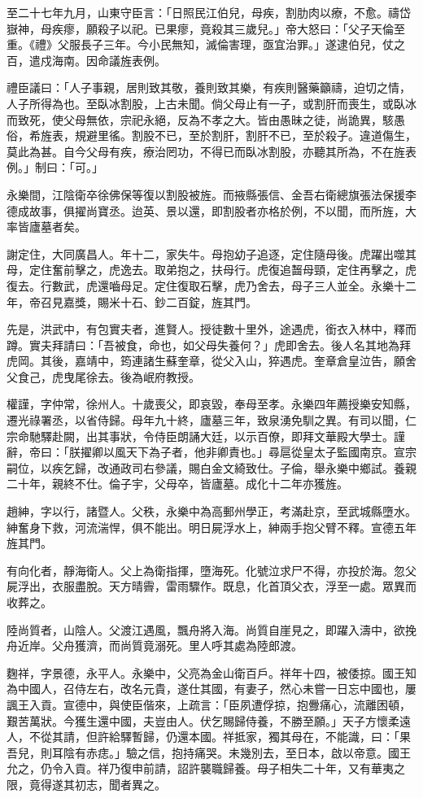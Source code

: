 \begin{pinyinscope}
至二十七年九月，山東守臣言：「日照民江伯兒，母疾，割肋肉以療，不愈。禱岱嶽神，母疾瘳，願殺子以祀。已果瘳，竟殺其三歲兒。」帝大怒曰：「父子天倫至重。《禮》父服長子三年。今小民無知，滅倫害理，亟宜治罪。」遂逮伯兒，仗之百，遣戍海南。因命議旌表例。

禮臣議曰：「人子事親，居則致其敬，養則致其樂，有疾則醫藥籲禱，迫切之情，人子所得為也。至臥冰割股，上古未聞。倘父母止有一子，或割肝而喪生，或臥冰而致死，使父母無依，宗祀永絕，反為不孝之大。皆由愚昧之徒，尚詭異，駭愚俗，希旌表，規避里徭。割股不已，至於割肝，割肝不已，至於殺子。違道傷生，莫此為甚。自今父母有疾，療治罔功，不得已而臥冰割股，亦聽其所為，不在旌表例。」制曰：「可。」

永樂間，江陰衛卒徐佛保等復以割股被旌。而掖縣張信、金吾右衛總旗張法保援李德成故事，俱擢尚寶丞。迨英、景以還，即割股者亦格於例，不以聞，而所旌，大率皆廬墓者矣。

謝定住，大同廣昌人。年十二，家失牛。母抱幼子追逐，定住隨母後。虎躍出噬其母，定住奮前擊之，虎逸去。取弟抱之，扶母行。虎復追齧母頸，定住再擊之，虎復去。行數武，虎還嚙母足。定住復取石擊，虎乃舍去，母子三人並全。永樂十二年，帝召見嘉獎，賜米十石、鈔二百錠，旌其門。

先是，洪武中，有包實夫者，進賢人。授徒數十里外，途遇虎，銜衣入林中，釋而蹲。實夫拜請曰：「吾被食，命也，如父母失養何？」虎即舍去。後人名其地為拜虎岡。其後，嘉靖中，筠連諸生蘇奎章，從父入山，猝遇虎。奎章倉皇泣告，願舍父食己，虎曳尾徐去。後為岷府教授。

權謹，字仲常，徐州人。十歲喪父，即哀毀，奉母至孝。永樂四年薦授樂安知縣，遷光祿署丞，以省侍歸。母年九十終，廬墓三年，致泉湧免馴之異。有司以聞，仁宗命馳驛赴闕，出其事狀，令侍臣朗誦大廷，以示百僚，即拜文華殿大學士。謹辭，帝曰：「朕擢卿以風天下為子者，他非卿責也。」尋扈從皇太子監國南京。宣宗嗣位，以疾乞歸，改通政司右參議，賜白金文綺致仕。子倫，舉永樂中鄉試。養親二十年，親終不仕。倫子宇，父母卒，皆廬墓。成化十二年亦獲旌。

趙紳，字以行，諸暨人。父秩，永樂中為高郵州學正，考滿赴京，至武城縣墮水。紳奮身下救，河流湍悍，俱不能出。明日屍浮水上，紳兩手抱父臂不釋。宣德五年旌其門。

有向化者，靜海衛人。父上為衛指揮，墮海死。化號泣求尸不得，亦投於海。忽父屍浮出，衣服盡脫。天方晴霽，雷雨驟作。既息，化首頂父衣，浮至一處。眾異而收葬之。

陸尚質者，山陰人。父渡江遇風，飄舟將入海。尚質自崖見之，即躍入濤中，欲挽舟近岸。父舟獲濟，而尚質竟溺死。里人呼其處為陸郎渡。

麴祥，字景德，永平人。永樂中，父亮為金山衛百戶。祥年十四，被倭掠。國王知為中國人，召侍左右，改名元貴，遂仕其國，有妻子，然心未嘗一日忘中國也，屢諷王入貢。宣德中，與使臣偕來，上疏言：「臣夙遭俘掠，抱釁痛心，流離困頓，艱苦萬狀。今獲生還中國，夫豈由人。伏乞賜歸侍養，不勝至願。」天子方懷柔遠人，不從其請，但許給驛暫歸，仍還本國。祥抵家，獨其母在，不能識，曰：「果吾兒，則耳陰有赤痣。」驗之信，抱持痛哭。未幾別去，至日本，啟以帝意。國王允之，仍令入貢。祥乃復申前請，詔許襲職歸養。母子相失二十年，又有華夷之限，竟得遂其初志，聞者異之。


\end{pinyinscope}